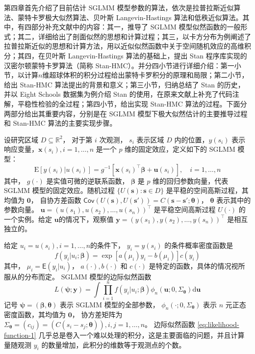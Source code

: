 \documentclass[12pt,a4paper,UTF8,twoside]{book}
\begin{document}
第四章首先介绍了目前估计 SGLMM
模型参数的算法，依次是拉普拉斯近似算法、蒙特卡罗极大似然算法、贝叶斯
Langevin-Hastings
算法和低秩近似算法。其中，有四部分补充文献中的内容：其一，推导了 SGLMM
模型似然函数的一般形式；其二，详细给出了剖面似然的思想和计算过程；其三，以卡方分布为例阐述了拉普拉斯近似的思想和计算方法，用以近似似然函数中关于空间随机效应的高维积分；其四，在贝叶斯
Langevin-Hastings 算法的基础上，提出 Stan
程序库实现的汉密尔顿蒙特卡罗算法（简称
Stan-HMC）。并分四小节进行详细介绍：第一小节，以计算\(n\)维超球体积的积分过程给出蒙特卡罗积分的原理和局限；第二小节，给出
Stan-HMC 算法提出的背景和意义；第三小节，归纳总结了 Stan 的历史，并以
Eight Schools 数据集为例介绍 Stan
的使用，在原来文献上补充了代码注解，平稳性检验的全过程；第四小节，给出实现
Stan-HMC 算法的过程。下面分两部分给出其重要内容，分别是在 SGLMM
模型下极大似然估计的主要推导过程和 Stan-HMC 算法的主要实现步骤。

设研究区域 \(D \subseteq \mathbb{R}^2\)， 对于第 \(i\) 次观测， \(s_i\)
表示区域 \(D\) 内的位置，\(y(s_i)\)
表示响应变量，\(\mathbf{x}(s_i), i = 1, \ldots, n\) 是一个 \(p\)
维的固定效应，定义如下的 SGLMM 模型： \[
\mathrm{E}[y(s_i)|u(s_i)] = g^{-1}[\mathbf{x}(s_i)^{\top}\boldsymbol{\beta} + \mathbf{u}(s_i)], \quad i = 1, \ldots, n
\] \noindent 其中， \(g(\cdot)\) 是实值可微的逆联系函数，
\(\boldsymbol{\beta}\) 是 \(p\) 维的回归参数向量，代表 SGLMM
模型的固定效应。随机过程 \(\{U(\mathbf{s}): \mathbf{s} \in D\}\)
是平稳的空间高斯过程，其均值为 \(\mathbf{0}\)， 自协方差函数
\(\mathsf{Cov}(U(\mathbf{s}),U(\mathbf{s}')) = C(\mathbf{s} - \mathbf{s}'; \boldsymbol{\theta})\)，
\(\boldsymbol{\theta}\) 表示其中的参数向量。
\(\mathbf{u} = (u(s_1),u(s_2),\ldots,u(s_n))^{\top}\) 是平稳空间高斯过程
\(U(\cdot)\) 的一个实例。给定 \(\mathbf{u}\)的情况下，观察值
\(\mathbf{y} = (y(s_1),y(s_2),\ldots,y(s_n))^{\top}\) 是相互独立的。

给定 \(u_i = u(s_i), i = 1, \ldots, n\)的条件下， \(y_i = y(s_i)\)
的条件概率密度函数是 \[
f(y_i|u_i;\boldsymbol{\beta}) = \exp[a(\mu_i)y_i - b(\mu_i)]c(y_i)
\] \noindent 其中， \(\mu_i = \mathsf{E}(y_i|u_i)\)，
\(a(\cdot),b(\cdot)\) 和 \(c(\cdot)\)
是特定的函数，具体的情况视所服从的分布而定。 SGLMM 模型的边际似然函数
\begin{equation}
L(\boldsymbol{\psi};\mathbf{y}) = \int \prod_{i=1}^{n} f(y_i|u_i;\boldsymbol{\beta})\phi_{n}(\mathbf{u};0,\Sigma_{\boldsymbol{\theta}})\mathrm{d}\mathbf{u} \label{eq:likelihood-function-1}
\end{equation} \noindent 记号
\(\boldsymbol{\psi} = (\boldsymbol{\beta},\boldsymbol{\theta})\) 表示
SGLMM 模型的全部参数，
\(\phi_{n}(\cdot;0,\Sigma_{\boldsymbol{\theta}})\) 表示 \(n\)
元正态密度函数，其均值为 \(\mathbf{0}\)， 协方差矩阵为
\(\Sigma_{\boldsymbol{\theta}} = (c_{ij}) = (C(s_i - s_j; \boldsymbol{\theta})), i,j = 1, \ldots, n\)。
边际似然函数 \eqref{eq:likelihood-function-1}
几乎总是卷入一个难以处理的积分，这是主要面临的问题，并且计算量随观测
\(y_i\) 的数量增加，此积分的维数等于观测点的个数。
\end{document}
